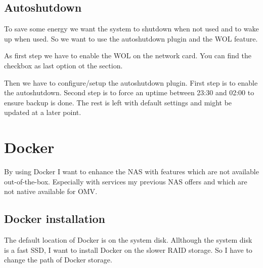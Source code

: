 \subsection{Autoshutdown}

To save some energy we want the system to shutdown when not used and to wake up
when used. So we want to use the autoshutdown plugin and the \gls{WOL} feature.


As first step we have to enable the \gls{WOL} on the network card. You can find
the checkbox as last option ot the  section.


Then we have to configure/setup the autoshutdown plugin. First step is to
enable the autoshutdown. Second step is to force an uptime between 23:30 and
02:00 to ensure backup is done. The rest is left with default settings and
might be updated at a later point.




\section{Docker}

By using \gls{Docker} I want to enhance the \gls{NAS} with features which are not
available out-of-the-box. Especially with services my previous \gls{NAS} offers
and which are not native available for \gls{OMV}.

\subsection{Docker installation}

The default location of \gls{Docker} is  on the
system disk. Allthough the system disk is a fast SSD, I want to install
\gls{Docker} on the slower RAID storage. So I have to change the path of
\gls{Docker} storage.


